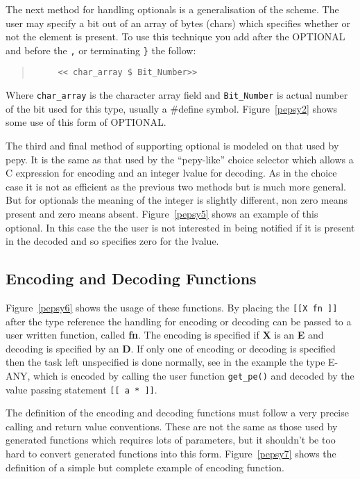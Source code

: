 The next method for handling optionals
is a generalisation of the  scheme.
The user may specify a bit out of an array of bytes (chars) which
specifies whether or not the element is present.
To use this technique you add after the OPTIONAL
and before the \verb"," or terminating \verb"}" the follow:
\begin{quote}\begin{verbatim}
     << char_array $ Bit_Number>>
\end{verbatim}\end{quote}

Where \verb"char_array" is the character array field
and \verb"Bit_Number" is actual number of the bit used for this type,
usually a \#define symbol.
Figure~\ref{pepsy2} shows some use of this form of OPTIONAL.

The third and final method of supporting optional is modeled on that used
by pepy.
It is the same as that used by the ``pepy-like'' choice selector which
allows a C expression for encoding and an integer lvalue for decoding.
As in the choice case it is not as efficient as the previous two methods
but is much more general.
But for optionals the meaning of the integer is slightly different, non zero
means present and zero means absent.
Figure~\ref{pepsy5} shows an example of this optional.
In this case the
the user is not interested in being notified if it is present in the
decoded and so specifies zero for the lvalue.


\subsection{Encoding and Decoding Functions}


Figure~\ref{pepsy6} shows the usage of these functions.
By placing the \verb"[[X fn ]]" after the type reference the handling for
encoding or decoding can be passed to a user written function, called {\bf fn}.
The encoding is specified if {\bf X} is an {\bf E} and decoding is
specified by an {\bf D}.
If only one of encoding or decoding is specified then the task left
unspecified is done normally, see in the example the type E-ANY, which
is encoded by calling the user function \verb"get_pe()" and decoded by
the value passing statement \verb"[[ a * ]]".

The definition of the encoding and decoding functions must follow a very
precise calling and return value conventions.
These are not the same as those used by  generated functions
which requires lots of parameters, but it shouldn't be too hard to convert
 generated functions into this form.
Figure~\ref{pepsy7} shows the definition of a simple but complete example of
encoding function.

